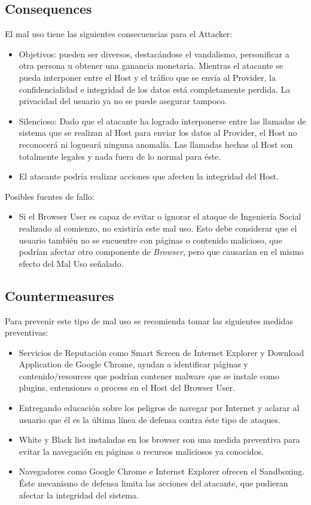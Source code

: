 \documentclass{sig-alternate-05-2015}
\begin{document}
\subsection{Consequences}
  El mal uso tiene las siguientes consecuencias para el Attacker:
  \begin{itemize}
    \item Objetivos: pueden ser diversos, destacándose el vandalismo, personificar a otra persona u obtener una ganancia monetaria. Mientras el atacante se pueda interponer entre el Host y el tráfico que se envía al Provider, la confidencialidad e integridad de los datos está completamente perdida. La privacidad del usuario ya no se puede asegurar tampoco.
    \item Silencioso: Dado que el atacante ha logrado interponerse entre las llamadas de sistema que se realizan al Host para enviar los datos al Provider, el Host no reconocerá ni logueará ninguna anomalía. Las llamadas hechas al Host son totalmente legales y nada fuera de lo normal para éste.
    \item El atacante podría realizar acciones que afecten la integridad del Host.
  \end{itemize}
  Posibles fuentes de fallo:
  \begin{itemize}
    \item Si el Browser User es capaz de evitar o ignorar el ataque de Ingeniería Social realizado al comienzo, no existiría este mal uso. Esto debe considerar que el usuario también no se encuentre con páginas o contenido malicioso, que podrían afectar otro componente de \textit{Browser}, pero que causarían en el mismo efecto del Mal Uso señalado.
  \end{itemize}

\subsection{Countermeasures} 
  Para prevenir este tipo de mal uso se recomienda tomar las siguientes medidas preventivas:
  \begin{itemize}
    \item Servicios de Reputación como Smart Screen de Internet Explorer y Download Application de Google Chrome, ayudan a identificar páginas y contenido/resources que podrían contener malware que se instale como plugins, entensiones o process en el Host del Browser User.
    \item Entregando educación sobre los peligros de navegar por Internet y aclarar al usuario que él es la última línea de defensa contra éste tipo de ataques.
    \item White y Black list instaladas en los browser son una medida preventiva para evitar la navegación en páginas o recursos maliciosos ya conocidos.
    \item Navegadores como Google Chrome e Internet Explorer ofrecen el Sandboxing. Éste mecanismo de defensa limita las acciones del atacante, que pudieran afectar la integridad del sistema.
  \end{itemize}
\end{document}

